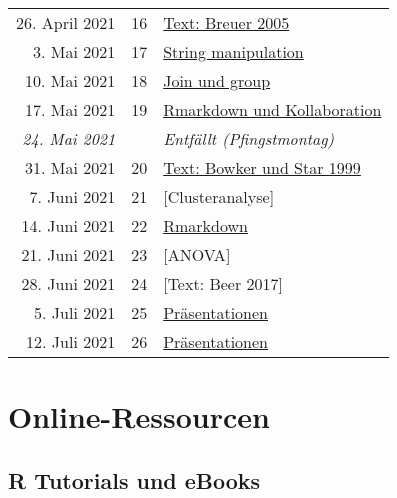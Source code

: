 \documentclass[
  ngerman,
]{article}
\begin{document}
\begin{longtable}[]{@{}rrl@{}}
26. April 2021 & 16 & \protect\hyperlink{text-breuer-2005}{Text: Breuer 2005} \\
3. Mai 2021 & 17 & \protect\hyperlink{string-manipulation}{String manipulation} \\
10. Mai 2021 & 18 & \protect\hyperlink{join-und-group}{Join und group} \\
17. Mai 2021 & 19 & \protect\hyperlink{rmarkdown-und-kollaboration}{Rmarkdown und Kollaboration} \\
\emph{24. Mai 2021} & & \emph{Entfällt (Pfingstmontag)} \\
31. Mai 2021 & 20 & \protect\hyperlink{text-bowker-und-star-1999}{Text: Bowker und Star 1999} \\
7. Juni 2021 & 21 & {[}Clusteranalyse{]} \\
14. Juni 2021 & 22 & \protect\hyperlink{rmarkdown}{Rmarkdown} \\
21. Juni 2021 & 23 & {[}ANOVA{]} \\
28. Juni 2021 & 24 & {[}Text: Beer 2017{]} \\
5. Juli 2021 & 25 & \protect\hyperlink{pruxe4sentationen}{Präsentationen} \\
12. Juli 2021 & 26 & \protect\hyperlink{pruxe4sentationen}{Präsentationen} \\
\bottomrule
\end{longtable}

\hypertarget{online-ressourcen}{%
\section*{Online-Ressourcen}\label{online-ressourcen}}

\hypertarget{r-tutorials-und-ebooks}{%
\subsection*{R Tutorials und eBooks}\label{r-tutorials-und-ebooks}}
\end{document}
